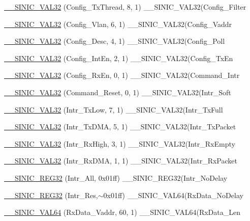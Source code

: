 \begin{DoxyCompactItemize}
\item 
\hyperlink{namespaceSinic_1_1Regs_a93862c2608fa0c0f83c8fa0972936784}{\_\-\_\-SINIC\_\-VAL32} (Config\_\-TxThread, 8, 1) \_\-\_\-SINIC\_\-VAL32(Config\_\-Filter
\item 
\hyperlink{namespaceSinic_1_1Regs_aa007f0659c38ef204cfffe32396ea15e}{\_\-\_\-SINIC\_\-VAL32} (Config\_\-Vlan, 6, 1) \_\-\_\-SINIC\_\-VAL32(Config\_\-Vaddr
\item 
\hyperlink{namespaceSinic_1_1Regs_ae0fbc614549507f08a2a4b846eb72bf2}{\_\-\_\-SINIC\_\-VAL32} (Config\_\-Desc, 4, 1) \_\-\_\-SINIC\_\-VAL32(Config\_\-Poll
\item 
\hyperlink{namespaceSinic_1_1Regs_afe2cd4380ee1a5e6f351a5396245bcf0}{\_\-\_\-SINIC\_\-VAL32} (Config\_\-IntEn, 2, 1) \_\-\_\-SINIC\_\-VAL32(Config\_\-TxEn
\item 
\hyperlink{namespaceSinic_1_1Regs_aa64e553e52828eeabd7a0f7a34df493a}{\_\-\_\-SINIC\_\-VAL32} (Config\_\-RxEn, 0, 1) \_\-\_\-SINIC\_\-VAL32(Command\_\-Intr
\item 
\hyperlink{namespaceSinic_1_1Regs_a092b9fc5be50a4046607e619a74bebd3}{\_\-\_\-SINIC\_\-VAL32} (Command\_\-Reset, 0, 1) \_\-\_\-SINIC\_\-VAL32(Intr\_\-Soft
\item 
\hyperlink{namespaceSinic_1_1Regs_ab74c21c9aae513bd929456c949a072b7}{\_\-\_\-SINIC\_\-VAL32} (Intr\_\-TxLow, 7, 1) \_\-\_\-SINIC\_\-VAL32(Intr\_\-TxFull
\item 
\hyperlink{namespaceSinic_1_1Regs_a592ae159611d8add61271ab85a94f4bb}{\_\-\_\-SINIC\_\-VAL32} (Intr\_\-TxDMA, 5, 1) \_\-\_\-SINIC\_\-VAL32(Intr\_\-TxPacket
\item 
\hyperlink{namespaceSinic_1_1Regs_a9eaf21ebdcaa54b7677e848153e9a98d}{\_\-\_\-SINIC\_\-VAL32} (Intr\_\-RxHigh, 3, 1) \_\-\_\-SINIC\_\-VAL32(Intr\_\-RxEmpty
\item 
\hyperlink{namespaceSinic_1_1Regs_a15c8e7a88ff5037b52606fad41516ae2}{\_\-\_\-SINIC\_\-VAL32} (Intr\_\-RxDMA, 1, 1) \_\-\_\-SINIC\_\-VAL32(Intr\_\-RxPacket
\item 
\hyperlink{namespaceSinic_1_1Regs_af59b1adc2e9d7e568f47395397b62a28}{\_\-\_\-SINIC\_\-REG32} (Intr\_\-All, 0x01ff) \_\-\_\-SINIC\_\-REG32(Intr\_\-NoDelay
\item 
\hyperlink{namespaceSinic_1_1Regs_aa9827c004ca9c2b42740c79987e60278}{\_\-\_\-SINIC\_\-REG32} (Intr\_\-Res,$\sim$0x01ff) \_\-\_\-SINIC\_\-VAL64(RxData\_\-NoDelay
\item 
\hyperlink{namespaceSinic_1_1Regs_a7937ce95cf94fb75724a5aa46f980303}{\_\-\_\-SINIC\_\-VAL64} (RxData\_\-Vaddr, 60, 1) \_\-\_\-SINIC\_\-VAL64(RxData\_\-Len

\end{DoxyCompactItemize}
